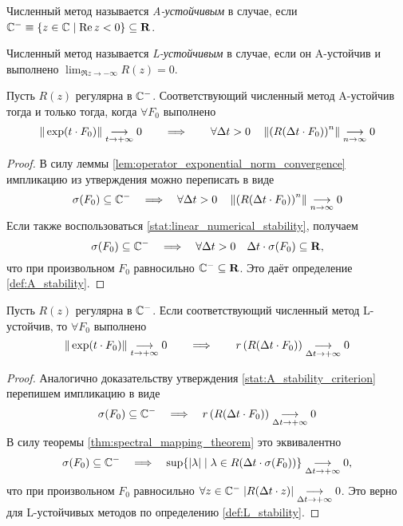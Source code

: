 \begin{definition}
    \label{def:A_stability}
    Численный метод называется \emph{A-устойчивым} в случае, если $ \mathbb{C}^- \equiv \{ z \in \mathbb{C} \mid \operatorname{Re} z < 0 \} \subseteq \mathbf{R} $.
\end{definition}

\begin{definition}
    \label{def:L_stability}
    Численный метод называется \emph{L-устойчивым} в случае, если он A-устойчив и выполнено $ \displaystyle\lim_{\Re z \to -\infty} R(z) = 0 $.
\end{definition}

\begin{statement}
    \label{stat:A_stability_criterion}
    Пусть $ R(z) $ регулярна в $ \mathbb{C}^- $.
    Соответствующий численный метод A-устойчив тогда и только тогда, когда $ \forall F_0 $ выполнено
    \[
        \| \exp(t \cdot F_0) \| \underset{t \to +\infty}{\longrightarrow} 0 \qquad \Longrightarrow \qquad \forall \Delta t > 0 \quad \left \| \left( R(\Delta t \cdot F_0) \right)^n \right\| \underset{n \to \infty}{\longrightarrow} 0
    \]
\end{statement}

\begin{proof}
    В силу леммы \ref{lem:operator_exponential_norm_convergence} импликацию из утверждения можно переписать в виде
    \[
        \sigma(F_0) \subseteq \mathbb{C}^- \quad \Longrightarrow \quad \forall \Delta t > 0 \quad \left \| \left( R(\Delta t \cdot F_0) \right)^n \right\| \underset{n \to \infty}{\longrightarrow} 0
    \]
    Если также воспользоваться \ref{stat:linear_numerical_stability}, получаем
    \[
        \sigma(F_0) \subseteq \mathbb{C}^- \quad \Longrightarrow \quad \forall \Delta t > 0 \quad \Delta t \cdot \sigma(F_0) \subseteq \mathbf{R},
    \]
    что при произвольном $ F_0 $ равносильно $ \mathbb{C}^- \subseteq \mathbf{R} $.
    Это даёт определение \ref{def:A_stability}.
\end{proof}

\begin{statement}
    \label{stat:L_stability_property}
    Пусть $ R(z) $ регулярна в $ \mathbb{C}^- $.
    Если соответствующий численный метод L-устойчив, то $ \forall F_0 $ выполнено
    \[
        \| \exp(t \cdot F_0) \| \underset{t \to +\infty}{\longrightarrow} 0 \qquad \Longrightarrow \qquad r \left( R(\Delta t \cdot F_0) \right) \underset{\Delta t \to +\infty}{\longrightarrow} 0
    \]
\end{statement}

\begin{proof}
    Аналогично доказательству утверждения \ref{stat:A_stability_criterion} перепишем импликацию в виде
    \[
        \sigma(F_0) \subseteq \mathbb{C}^- \quad \Longrightarrow \quad r \left( R(\Delta t \cdot F_0) \right) \underset{\Delta t \to +\infty}{\longrightarrow} 0
    \]
    В силу теоремы \ref{thm:spectral_mapping_theorem} это эквивалентно
    \[
        \sigma(F_0) \subseteq \mathbb{C}^- \quad \Longrightarrow \quad \sup \{ |\lambda| \mid \lambda \in R(\Delta t \cdot \sigma(F_0)) \} \underset{\Delta t \to +\infty}{\longrightarrow} 0,
    \]
    что при произвольном $ F_0 $ равносильно $ \forall z \in \mathbb{C}^- \; | R(\Delta t \cdot z) | \underset{\Delta t \to +\infty}{\longrightarrow} 0 $.
    Это верно для L-устойчивых методов по определению \ref{def:L_stability}.
\end{proof}

